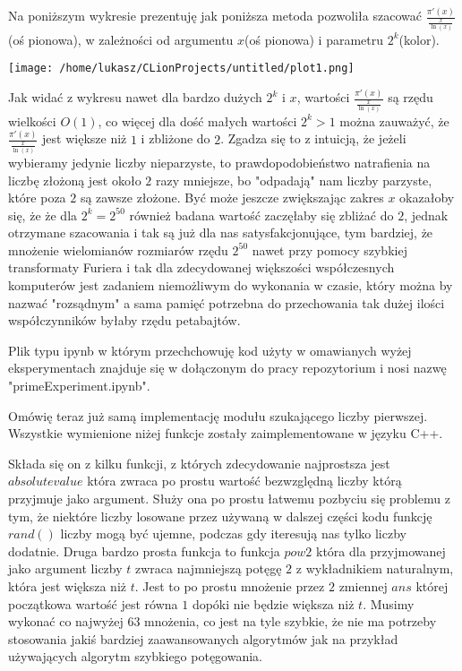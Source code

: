 \documentclass{article}
\begin{document}
Na poniższym wykresie prezentuję jak poniższa metoda pozwoliła szacować $\frac{\pi'(x)}{\frac{x}{\ln(x)}}$
(oś pionowa), w zależności od argumentu $x$(oś pionowa) i parametru $2^k$(kolor).

\begingroup
\centering
\texttt{[image: /home/lukasz/CLionProjects/untitled/plot1.png]}
\endgroup

Jak widać z wykresu nawet dla bardzo dużych $2^k$ i $x$, wartości $\frac{\pi'(x)}{\frac{x}{\ln(x)}}$ są 
rzędu wielkości $O(1)$, co więcej dla dość małych wartości $2^k>1$ można zauważyć, że $\frac{\pi'(x)}{\frac{x}{\ln(x)}}$ jest 
większe niż $1$ i zbliżone do $2$. Zgadza się to z intuicją, że jeżeli wybieramy jedynie liczby nieparzyste,
to prawdopodobieństwo natrafienia na liczbę złożoną jest około $2$ razy mniejsze, bo "odpadają" nam 
liczby parzyste, które poza $2$ są zawsze złożone. Być może jeszcze zwiększając zakres $x$ okazałoby się, że 
że dla $2^k=2^{50}$ również badana wartość zaczęłaby się zbliżać do $2$, jednak otrzymane szacowania i tak
są już dla nas satysfakcjonujące, tym bardziej, że mnożenie wielomianów rozmiarów rzędu $2^{50}$ nawet przy pomocy
szybkiej transformaty Furiera i tak dla zdecydowanej większości współczesnych komputerów jest zadaniem niemożliwym
do wykonania w czasie, który można by nazwać "rozsądnym" a sama pamięć potrzebna do przechowania
tak dużej ilości współczynników byłaby rzędu petabajtów. 

Plik typu ipynb w którym przechchowuję kod użyty w omawianych wyżej eksperymentach znajduje się
w dołączonym do pracy repozytorium i nosi nazwę "primeExperiment.ipynb".


Omówię teraz już samą implementację modułu szukającego liczby pierwszej. Wszystkie wymienione niżej funkcje zostały 
zaimplementowane w języku C++.

Składa się on z kilku funkcji, z których zdecydowanie najprostsza jest $absolutevalue$ która
zwraca po prostu wartość bezwzględną liczby którą przyjmuje jako argument. Służy ona po prostu
łatwemu pozbyciu się problemu z tym, że niektóre liczby losowane przez używaną w dalszej
części kodu funkcję $rand()$ liczby mogą być ujemne, podczas gdy iteresują nas tylko liczby dodatnie. 
Druga bardzo prosta funkcja to funkcja $pow2$ która dla przyjmowanej jako argument liczby $t$ 
zwraca najmniejszą potęgę $2$ z wykładnikiem naturalnym, która jest większa niż $t$. Jest to po prostu
mnożenie przez $2$ zmiennej $ans$ której początkowa wartość jest równa $1$ dopóki nie będzie 
większa niż $t$. Musimy wykonać co najwyżej $63$ mnożenia, co jest na tyle szybkie, że nie ma 
potrzeby stosowania jakiś bardziej zaawansowanych algorytmów jak na przykład 
używających algorytm szybkiego potęgowania.
\end{document}
